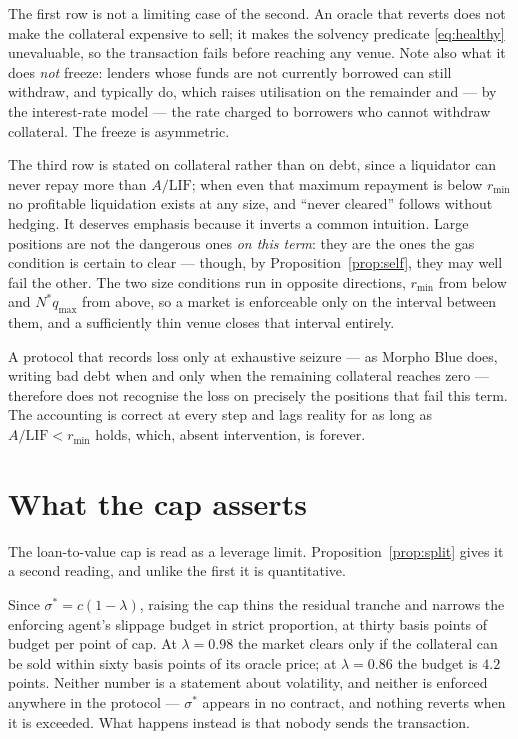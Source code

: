 \documentclass[11pt,a4paper]{article}
\theoremstyle{plain}
\theoremstyle{definition}
\theoremstyle{remark}
\newcommand{\LIF}{\mathrm{LIF}}
\begin{document}
The first row is not a limiting case of the second. An oracle that reverts does not make the
collateral expensive to sell; it makes the solvency predicate \eqref{eq:healthy} unevaluable, so
the transaction fails before reaching any venue. Note also what it does \emph{not} freeze: lenders
whose funds are not currently borrowed can still withdraw, and typically do, which raises
utilisation on the remainder and --- by the interest-rate model --- the rate charged to borrowers
who cannot withdraw collateral. The freeze is asymmetric.

The third row is stated on collateral rather than on debt, since a liquidator can never repay more
than $A/\LIF$; when even that maximum repayment is below $r_{\min}$ no profitable liquidation
exists at any size, and ``never cleared'' follows without hedging. It deserves emphasis because it
inverts a common intuition. Large positions are not the dangerous ones \emph{on this term}: they
are the ones the gas condition is certain to clear --- though, by Proposition~\ref{prop:self},
they may well fail the other. The two size conditions run in opposite directions, $r_{\min}$ from
below and $N^{*}q_{\max}$ from above, so a market is enforceable only on the interval between
them, and a sufficiently thin venue closes that interval entirely.

A protocol that records loss only at exhaustive seizure --- as Morpho Blue does, writing bad debt
when and only when the remaining collateral reaches zero --- therefore does not recognise the loss
on precisely the positions that fail this term. The accounting is correct at every step and lags
reality for as long as $A/\LIF<r_{\min}$ holds, which, absent intervention, is forever.

\section{What the cap asserts}

The loan-to-value cap is read as a leverage limit. Proposition~\ref{prop:split} gives it a second
reading, and unlike the first it is quantitative.

Since $\sigma^{*}=c(1-\lambda)$, raising the cap thins the residual tranche and narrows the
enforcing agent's slippage budget in strict proportion, at thirty basis points of budget per point
of cap. At $\lambda=0.98$ the market clears only if the collateral can be sold within sixty basis
points of its oracle price; at $\lambda=0.86$ the budget is $4.2$ points. Neither number is a
statement about volatility, and neither is enforced anywhere in the protocol --- $\sigma^{*}$
appears in no contract, and nothing reverts when it is exceeded. What happens instead is that
nobody sends the transaction.
\end{document}

